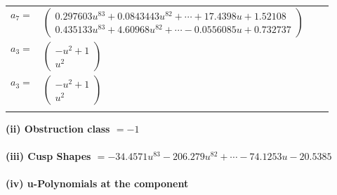 \documentclass[1p]{elsarticle_modified}
\theoremstyle{definition}
\begin{document}
\begin{tabular}{m{7pt} m{180pt} m{7pt} m{180pt} }
\flushright $a_{7}=$&$\begin{pmatrix}0.297603 u^{83}+0.0843443 u^{82}+\cdots+17.4398 u+1.52108\\0.435133 u^{83}+4.60968 u^{82}+\cdots-0.0556085 u+0.732737\end{pmatrix}$ \\
\flushright $a_{3}=$&$\begin{pmatrix}- u^2+1\\u^2\end{pmatrix}$\\ \flushright $a_{3}=$&$\begin{pmatrix}- u^2+1\\u^2\end{pmatrix}$\\&\end{tabular}
\flushleft \textbf{(ii) Obstruction class $= -1$}\\~\\
\flushleft \textbf{(iii) Cusp Shapes $= -34.4571 u^{83}-206.279 u^{82}+\cdots-74.1253 u-20.5385$}\\~\\
\newpage\renewcommand{\arraystretch}{1}
\flushleft \textbf{(iv) u-Polynomials at the component}\newline \\
\end{document}
